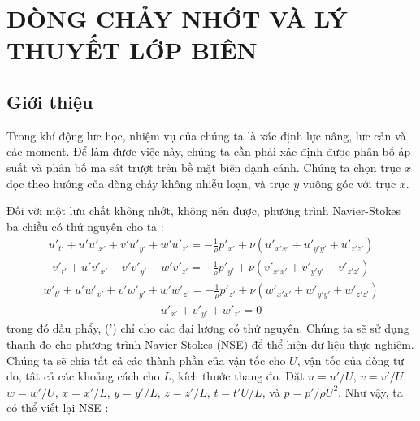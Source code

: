 \documentclass[KHI_DONG_HOC.tex]{subfiles}
\begin{document}
\chapter{DÒNG CHẢY NHỚT VÀ LÝ THUYẾT LỚP BIÊN}
\section{Giới thiệu}
Trong khí động lực học, nhiệm vụ của chúng ta là xác định lực nâng, lực cản và các moment. Để làm được việc này, chúng ta cần phải xác định được phân bố áp suất và phân bố ma sát trượt trên bề mặt biên dạnh cánh. Chúng ta chọn trục $x$ dọc theo hướng của dòng chảy không nhiễu loạn, và trục $y$ vuông góc với trục $x$.

Đối với một lưu chất không nhớt, không nén được, phương trình Navier-Stokes ba chiều có thứ nguyên cho ta :
\begin{equation}
	\begin{aligned}
		u{'_{t'}} + u'u{'_{x'}} + v'u{'_{y'}} + w'u'{ _{z'}} =  - \frac{1}{\rho }p{'_{x'}} + \nu\left( {u{'_{x'x'}} + u{'_{y'y'}} + u{'_{z'z'}}} \right)
	\end{aligned}
\end{equation}
\begin{equation}
	\begin{aligned}
		v{'_{t'}} + u'v{'_{x'}} + v'v{'_{y'}} + w'v'{ _{z'}} =  - \frac{1}{\rho }p{'_{y'}} + \nu\left( {v{'_{x'x'}} + v{'_{y'y'}} + v{'_{z'z'}}} \right)
	\end{aligned}
\end{equation}
\begin{equation}
	\begin{aligned}
		w{'_{t'}} + u'w{'_{x'}} + v'w{'_{y'}} + w'w'{ _{z'}} =  - \frac{1}{\rho }p{'_{z'}} + \nu\left( {w{'_{x'x'}} + w{'_{y'y'}} + w{'_{z'z'}}} \right)
	\end{aligned}
\end{equation}
\begin{equation}
	\begin{aligned}
		u{'_{x'}} + v{'_{y'}} + w{'_{z'}} = 0
	\end{aligned}
\end{equation}
trong đó dấu phẩy, (') chỉ cho các đại lượng có thứ nguyên. Chúng ta sẽ sử dụng thanh đo cho phương trình Navier-Stokes (NSE) để thể hiện dữ liệu thực nghiệm. Chúng ta sẽ chia tất cả các thành phần của vận tốc cho $U$, vận tốc của dòng tự do, tât cả các khoảng cách cho $L$, kích thước thang đo. Đặt $u=u'/U$, $v=v'/U$, $w=w'/U$, $x=x'/L$, $y=y'/L$, $z=z'/L$, $t=t'U/L$, và $p=p'/\rho U^2$. Như vậy, ta có thể viết lại NSE :
\end{document}
